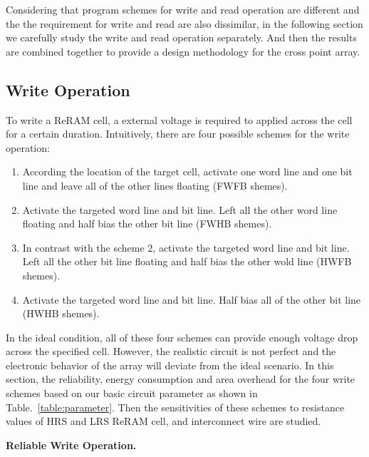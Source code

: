 Considering that program schemes for write and read operation are different and the the requirement for write and read are also dissimilar, in the following section we carefully study the write and read operation separately. And then the results are combined together to provide a design methodology for the cross point array.

\subsection{Write Operation}
To write a ReRAM cell, a external voltage is required to applied across the cell for a certain duration. Intuitively, there are four possible schemes for the write operation:
\begin{enumerate}
  \item According the location of the target cell, activate one word line and one bit line and leave all of the other lines floating (FWFB shemes).
  \item Activate the targeted word line and bit line. Left all the other word line floating and half bias the other bit line (FWHB shemes).
  \item In contrast with the scheme 2, activate the targeted word line and bit line. Left all the other bit line floating and half bias the other wold line (HWFB shemes).
  \item Activate the targeted word line and bit line. Half bias all of the other bit line (HWHB shemes).
\end{enumerate}

In the ideal condition, all of these four schemes can provide enough voltage drop across the specified cell. However, the realistic circuit is not perfect and the electronic behavior of the array will deviate from the ideal scenario. In this section, the reliability, energy consumption and area overhead for the four write schemes based on our basic circuit parameter as shown in Table.~\ref{table:parameter}. Then the sensitivities of these schemes to resistance values of HRS and LRS ReRAM cell, and interconnect wire are studied.

\vspace{10pt}
\textbf{Reliable Write Operation.}
\vspace{8pt}

